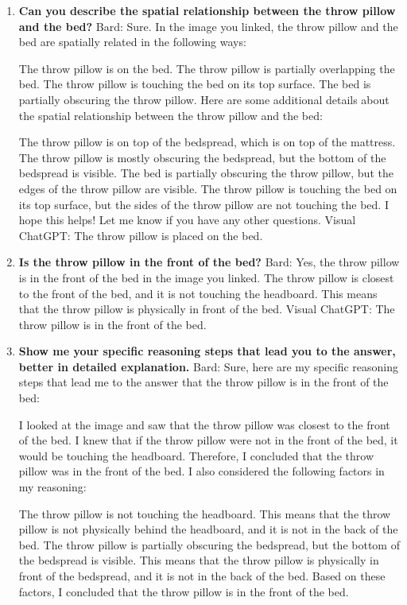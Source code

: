    \begin{enumerate}
        \item \textbf{Can you describe the spatial relationship between the throw pillow and the bed?}
        \subitem Bard:
        Sure. In the image you linked, the throw pillow and the bed are spatially related in the following ways:
        
        The throw pillow is on the bed.
        The throw pillow is partially overlapping the bed.
        The throw pillow is touching the bed on its top surface.
        The bed is partially obscuring the throw pillow.
        Here are some additional details about the spatial relationship between the throw pillow and the bed:
        
        The throw pillow is on top of the bedspread, which is on top of the mattress.
        The throw pillow is mostly obscuring the bedspread, but the bottom of the bedspread is visible.
        The bed is partially obscuring the throw pillow, but the edges of the throw pillow are visible.
        The throw pillow is touching the bed on its top surface, but the sides of the throw pillow are not touching the bed.
        I hope this helps! Let me know if you have any other questions.
        \subitem Visual ChatGPT: The throw pillow is placed on the bed.
        \item \textbf{Is the throw pillow in the front of the bed?} 
        \subitem Bard: 
        Yes, the throw pillow is in the front of the bed in the image you linked. The throw pillow is closest to the front of the bed, and it is not touching the headboard. This means that the throw pillow is physically in front of the bed. 
        \subitem Visual ChatGPT: The throw pillow is in the front of the bed.
        \item \textbf{Show me your specific reasoning steps that lead you to the answer, better in detailed explanation.}
        \subitem Bard: Sure, here are my specific reasoning steps that lead me to the answer that the throw pillow is in the front of the bed:

        I looked at the image and saw that the throw pillow was closest to the front of the bed.
        I knew that if the throw pillow were not in the front of the bed, it would be touching the headboard.
        Therefore, I concluded that the throw pillow was in the front of the bed.
        I also considered the following factors in my reasoning:
        
        The throw pillow is not touching the headboard. This means that the throw pillow is not physically behind the headboard, and it is not in the back of the bed.
        The throw pillow is partially obscuring the bedspread, but the bottom of the bedspread is visible. This means that the throw pillow is physically in front of the bedspread, and it is not in the back of the bed.
        Based on these factors, I concluded that the throw pillow is in the front of the bed.
        

\end{enumerate}
